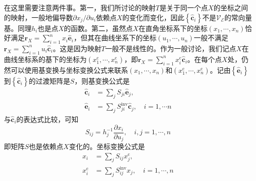 \documentclass[../main.tex]{subfiles}
\begin{document}
在这里需要注意两件事。第一，我们所讨论的映射$T$是关于同一个点$X$的坐标之间的映射，一般地偏导数$\partial x_j/\partial u_i$依赖点$X$的变化而变化，因此$\left\{\mathbf{\hat{c}}_i\right\}$不是$\mathcal{V}_{\mathcal{E}}$的常向量基。同理$h_i$也是点$X$的函数。第二，虽然点$X$在直角坐标系下的坐标$\left(x_1,\cdots,x_n\right)$恰好满足$\mathbf{r}_X=\sum_{i=1}^nx_i\mathbf{\hat{e}}_i$，但其在曲线坐系下的坐标$\left(u_1,\cdots,u_n\right)$一般不满足$\mathbf{r}_X=\sum_{i=1}^nu_i\mathbf{\hat{c}}_i$。这是因为映射$T$一般不是线性的。作为一般讨论，我们记点$X$在曲线坐标系的基下的坐标为$\left(x_1^\mathrm{c},\cdots,x_n^\mathrm{c}\right)$，即$\mathbf{r}_X=\sum_{i=1}^nx_i^\mathrm{c}\mathbf{\hat{c}}_i$。在每个点$X$处，仍然可以使用基变换与坐标变换公式来联系$\left(x_1,\cdots,x_n\right)$和$\left(x_1^\mathrm{c},\cdots,x_n^\mathrm{c}\right)$。记由$\left\{\mathbf{\hat{e}}_i\right\}$到$\left\{\mathbf{\hat{c}}_i\right\}$的过渡矩阵是$S$，则基变换公式是
\[
    \begin{aligned}
        \mathbf{\hat{c}}_i & =\sum_{j}S_{ji}\mathbf{\hat{e}}_j,                               \\
        \mathbf{\hat{e}}_i & =\sum_j S_{ji}^\mathrm{inv}\mathbf{\hat{c}}_j,\quad i=1,\cdots n
    \end{aligned}
\]
与$\mathbf{\hat{c}}_i$的表达式比较，可知
\[S_{ij}=h_j^{-1}\frac{\partial x_i}{\partial u_j},\quad i,j=1,\cdots,n\]
即矩阵$S$也是依赖点$X$变化的。坐标变换公式是
\[
    \begin{aligned}
        x_i            & =\sum_j S_{ij}x_j^\mathrm{c},                    \\
        x_i^\mathrm{c} & =\sum_jS_{ij}^\mathrm{inv}x_j,\quad i=1,\cdots,n
    \end{aligned}
\]
\end{document}
